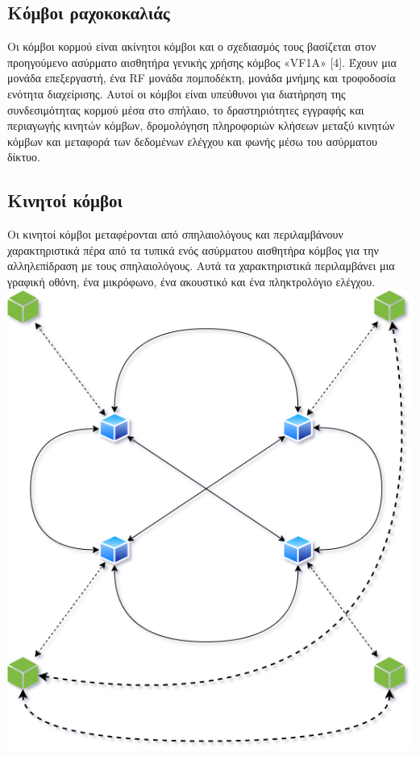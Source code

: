 \documentclass[12pt]{article}
\begin{document}
\begin{multicols}{2}
    \subsection{\small Κόμβοι ραχοκοκαλιάς}
        Οι κόμβοι κορμού είναι ακίνητοι κόμβοι και ο σχεδιασμός τους
        βασίζεται στον προηγούμενο ασύρματο αισθητήρα γενικής χρήσης
        κόμβος «VF1A» [4]. Έχουν μια μονάδα επεξεργαστή, ένα RF
        μονάδα πομποδέκτη, μονάδα μνήμης και τροφοδοσία
        ενότητα διαχείρισης. Αυτοί οι κόμβοι είναι υπεύθυνοι για
        διατήρηση της συνδεσιμότητας κορμού μέσα στο σπήλαιο, το
        δραστηριότητες εγγραφής και περιαγωγής κινητών κόμβων,
        δρομολόγηση πληροφοριών κλήσεων μεταξύ κινητών κόμβων και
        μεταφορά των δεδομένων ελέγχου και φωνής μέσω του ασύρματου
        δίκτυο.
    \subsection{\small Κινητοί κόμβοι}
        Οι κινητοί κόμβοι μεταφέρονται από σπηλαιολόγους και περιλαμβάνουν
        χαρακτηριστικά πέρα από τα τυπικά ενός ασύρματου αισθητήρα
        κόμβος για την αλληλεπίδραση με τους σπηλαιολόγους. Αυτά τα χαρακτηριστικά
        περιλαμβάνει μια γραφική οθόνη, ένα μικρόφωνο, ένα ακουστικό
        και ένα πληκτρολόγιο ελέγχου.
        \includegraphics*[scale=.4]{img/ICWMSN-WMSNpng.png}


\end{multicols}
\end{document}
